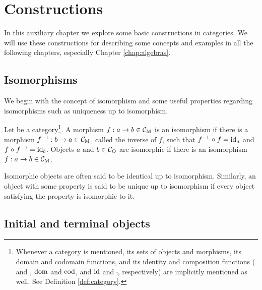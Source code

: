 \chapter{Constructions}
\label{chap:constructions}

In this auxiliary chapter we explore some basic constructions in
categories. We will use these constructions for describing some
concepts and examples in all the following chapters, especially
Chapter \ref{chap:algebras}.

\section{Isomorphisms}
\label{sec:constructions-isomorphisms}

We begin with the concept of isomorphism and some useful properties
regarding isomorphisms such as uniqueness up to isomorphism.

\begin{definition}
  \label{def:isomorphism}


  Let  be a category\footnote{Whenever a category  is
    mentioned, its sets of objects and morphisms, its domain and
    codomain functions, and its identity and composition functions
    ( and , $\operatorname{dom}$ and $\operatorname{cod}$, and $\operatorname{id}$ and $\comp$,
    respectively) are implicitly mentioned as well. See Definition
    \ref{def:category}.}. A morphism $f: a \to b \in \mathcal{C}_{\operatorname{M}}$ is an
  isomorphism if there is a morphism $f^{-1}: b \to a \in \mathcal{C}_{\operatorname{M}}$,
  called the inverse of $f$, such that $f^{-1} \mathrel{\circ} f = \operatorname{id}_{a}$ and
  $f \mathrel{\circ} f^{-1} = \operatorname{id}_{b}$. Objects $a$ and $b \in \mathcal{C}_{\operatorname{O}}$ are
  isomorphic if there is an isomorphism $f: a \to b \in \mathcal{C}_{\operatorname{M}}$.

\end{definition}

\begin{definition}
  \label{def:up-to-isomorphism}


  Isomorphic objects are often said to be identical up to isomorphism.
  Similarly, an object with some property is said to be unique up to
  isomorphism if every object satisfying the property is isomorphic to
  it.

\end{definition}

\section{Initial and terminal objects}
\label{sec:constructions-initial-terminal-objects}

